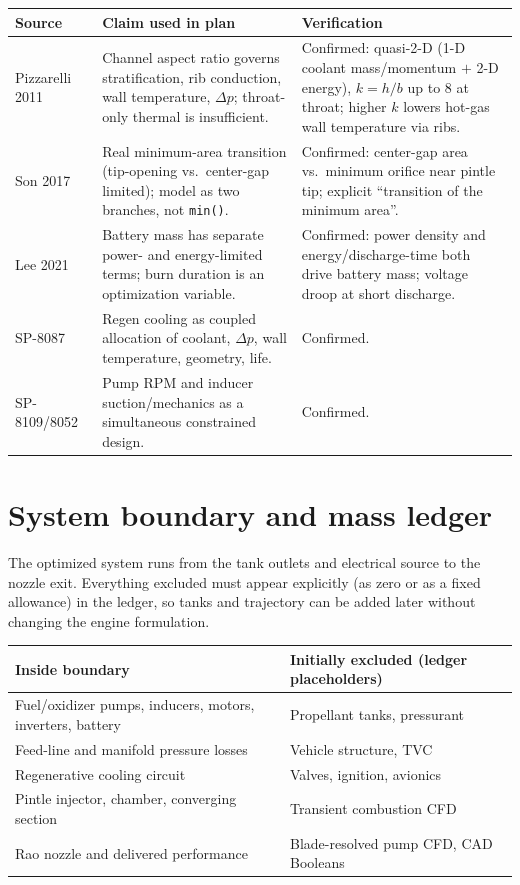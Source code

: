 \documentclass[11pt]{article}
\newcommand{\cmd}[1]{\nolinkurl{#1}}
\begin{document}
\begin{center}
\small
\begin{tabular}{@{}p{3.0cm}p{5.2cm}p{4.6cm}@{}}
\toprule
\textbf{Source} & \textbf{Claim used in plan} & \textbf{Verification} \\
\midrule
Pizzarelli 2011~\cite{pizzarelli2011} & Channel aspect ratio governs stratification, rib conduction, wall temperature, $\Delta p$; throat-only thermal is insufficient. & Confirmed: quasi-2-D (1-D coolant mass/momentum $+$ 2-D energy), $k=h/b$ up to $8$ at throat; higher $k$ lowers hot-gas wall temperature via ribs. \\
Son 2017~\cite{son2017} & Real minimum-area transition (tip-opening vs.\ center-gap limited); model as two branches, not \cmd{min()}. & Confirmed: center-gap area vs.\ minimum orifice near pintle tip; explicit ``transition of the minimum area''. \\
Lee 2021~\cite{lee2021} & Battery mass has separate power- and energy-limited terms; burn duration is an optimization variable. & Confirmed: power density and energy/discharge-time both drive battery mass; voltage droop at short discharge. \\
SP-8087~\cite{sp8087} & Regen cooling as coupled allocation of coolant, $\Delta p$, wall temperature, geometry, life. & Confirmed. \\
SP-8109/8052~\cite{sp8109,sp8052} & Pump RPM and inducer suction/mechanics as a simultaneous constrained design. & Confirmed. \\
\bottomrule
\end{tabular}
\end{center}

\section{System boundary and mass ledger}

The optimized system runs from the tank outlets and electrical source to the
nozzle exit. Everything excluded must appear explicitly (as zero or as a fixed
allowance) in the ledger, so tanks and trajectory can be added later without
changing the engine formulation.

\begin{center}
\small
\begin{tabular}{@{}p{6.4cm}p{6.4cm}@{}}
\toprule
\textbf{Inside boundary} & \textbf{Initially excluded (ledger placeholders)} \\
\midrule
Fuel/oxidizer pumps, inducers, motors, inverters, battery & Propellant tanks, pressurant \\
Feed-line and manifold pressure losses & Vehicle structure, TVC \\
Regenerative cooling circuit & Valves, ignition, avionics \\
Pintle injector, chamber, converging section & Transient combustion CFD \\
Rao nozzle and delivered performance & Blade-resolved pump CFD, CAD Booleans \\
\bottomrule
\end{tabular}
\end{center}
\end{document}
